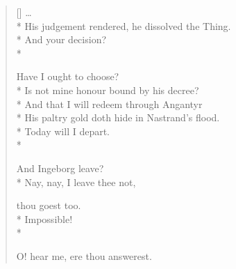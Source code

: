 \documentclass{memoir}
\begin{document}
\settowidth{\versewidth}{Nay, nay, I leave thee not,
                                       thou goest too}
\begin{verse}[\versewidth]
\ldots \\*
His judgement rendered, he dissolved the Thing. \\*
 And your decision? \\*
 

                                   Have I ought to choose? \\*
Is not mine honour bound by his decree? \\*
And that I will redeem through Angantyr \\*
His paltry gold doth hide in Nastrand’s flood. \\*
Today will I depart. \\*
 

                                 And Ingeborg leave? \\*
 Nay, nay, I leave thee not,

                                   thou goest too. \\*
 Impossible! \\*
 

                                   O! hear me, ere thou answerest.
\end{verse}
\end{document}
